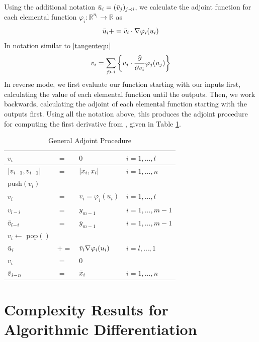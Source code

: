 \documentclass{article}
\begin{document}
Using the additional notation $\Bar{u}_i = (\Bar{v}_j)_{j \prec i}$, we calculate the adjoint function for each elemental function $\varphi_i : \mathbb{R}^{n_i} \longrightarrow \mathbb{R}$ as
\begin{equation}
    \Bar{u}_i += \Bar{v}_i \cdot \nabla \varphi_i (u_i)
\end{equation}
In notation similar to \eqref{tangentequ}
\begin{equation}
    \Bar{v}_i = \sum_{j \succ i} \left\{ \Bar{v}_j \cdot \frac{\partial}{\partial v_i} \varphi_j(u_j) \right\}
\end{equation}
In reverse mode, we first evaluate our function starting with our inputs first, calculating the value of each elemental function until the outputs. Then, we work backwards, calculating the adjoint of each elemental function starting with the outputs first. Using all the notation above, this produces the adjoint procedure for computing the first derivative from \cite{dhamarticle}, given in Table \ref{tab:ap}. 
\begin{table}[h]
    \centering
    \begin{tabular}{|llll|}
        \hline
        $v_{i}$ & $=$ & $0$ & $i = 1, \ldots, l$ \\
        \hline
        $[v_{i-1}, \Bar{v}_{i-1}]$ & $=$ & $[x_{i}, \Bar{x}_{i}]$ & $i = 1, \ldots, n$ \\
        \hline
        push$(v_i)$ & & & \\
        $v_{i}$ & $=$ & $v_i = \varphi_i (u_i)$ & $i = 1, \ldots, l$ \\
        \hline
        $v_{l-i}$ & $=$ & $y_{m-1}$ & $i = 1, \ldots, m-1$ \\
        $\Bar{v}_{l-i}$ & $=$ & $\bar{y}_{m-1}$ & $i = 1, \ldots, m-1$ \\
        \hline
        $v_i \leftarrow$ pop$()$ & & & \\
        $\Bar{u}_i$ & $+=$ & $\Bar{v}_i \nabla \varphi_i (u_i)$ & $i = l, \ldots, 1$ \\
        $v_i$ & $=$ & $0$ & \\
        \hline
        $\Bar{v}_{i-n}$ & $=$ & $\Bar{x}_i$ & $i = 1, \ldots, n$ \\
        \hline
    \end{tabular}
    \caption{General Adjoint Procedure}
    \label{tab:ap}
\end{table}

\section{Complexity Results for Algorithmic Differentiation}
\end{document}
